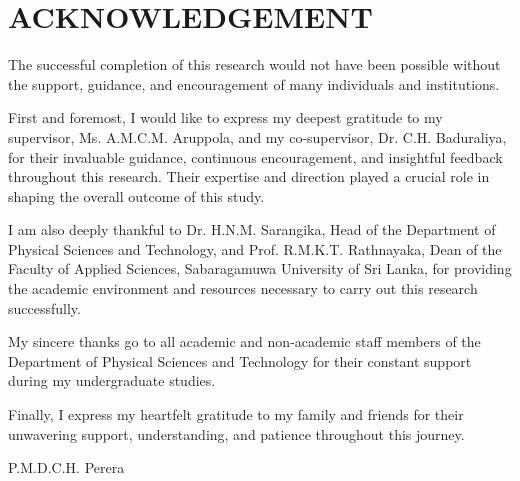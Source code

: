 \chapter*{ACKNOWLEDGEMENT}

The successful completion of this research would not have been possible without the support, guidance, and encouragement of many individuals and institutions.

First and foremost, I would like to express my deepest gratitude to my supervisor, Ms. A.M.C.M. Aruppola, and my co-supervisor, Dr. C.H. Baduraliya, for their invaluable guidance, continuous encouragement, and insightful feedback throughout this research. Their expertise and direction played a crucial role in shaping the overall outcome of this study.

I am also deeply thankful to Dr. H.N.M. Sarangika, Head of the Department of Physical Sciences and Technology, and Prof. R.M.K.T. Rathnayaka, Dean of the Faculty of Applied Sciences, Sabaragamuwa University of Sri Lanka, for providing the academic environment and resources necessary to carry out this research successfully.

My sincere thanks go to all academic and non-academic staff members of the Department of Physical Sciences and Technology for their constant support during my undergraduate studies.

Finally, I express my heartfelt gratitude to my family and friends for their unwavering support, understanding, and patience throughout this journey.

\vspace{1.5cm}

\noindent P.M.D.C.H. Perera
